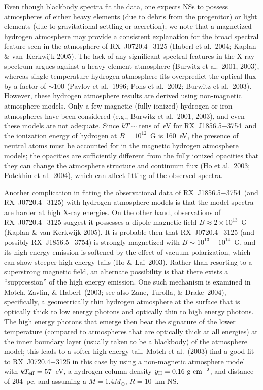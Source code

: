 \documentclass[useAMS,usegraphicx]{mn2e}
\newcommand{\etal}{et al.}
\newcommand{\rxjw}{RX~J1856.5$-$3754}
\newcommand{\ycol}{y_{\rm H}}
\newcommand{\teff}{\ensuremath{T_{\rm eff}}}
\begin{document}
Even though blackbody spectra fit the data, one expects NSs to possess
atmospheres of either heavy elements (due to debris from the progenitor)
or light elements (due to gravitational settling or accretion);
we note that a magnetized hydrogen atmosphere may provide a consistent
explanation for the broad spectral feature seen in the atmosphere of
RX~J0720.4$-$3125 (Haberl \etal~2004; Kaplan \& van~Kerkwijk 2005).
The lack of any significant spectral features in
the X-ray spectrum argues against a heavy element atmosphere (Burwitz
\etal~2001, 2003), whereas single
temperature hydrogen atmosphere fits overpredict the optical flux by a
factor of $\sim 100$ (Pavlov \etal~1996; Pons \etal~2002; Burwitz
\etal~2003).  However, these hydrogen atmosphere results are derived
using non-magnetic atmosphere models.  Only a few magnetic (fully
ionized) hydrogen or iron atmospheres have been considered (e.g.,
Burwitz \etal~2001, 2003), and even these models are not adequate.
Since $kT\sim\mbox{tens of}$~eV for
\rxjw\ and the ionization energy of hydrogen at $B=10^{12}$~G is
160~eV, the presence of neutral atoms must be accounted for in the
magnetic hydrogen atmosphere models; the opacities are sufficiently
different from the fully ionized opacities that they can change the
atmosphere structure and continuum flux (Ho \etal~2003; Potekhin \etal~2004),
which can affect fitting of the observed spectra.

Another complication in fitting the observational data of \rxjw\
(and RX~J0720.4$-$3125) with hydrogen atmosphere models is that the model
spectra are harder at high X-ray energies.
On the other hand, observations of RX~J0720.4$-$3125
suggest it possesses a dipole
magnetic field $B\approx 2\times 10^{13}$~G (Kaplan \& van Kerkwijk 2005).
It is probable then that RX~J0720.4$-$3125 (and possibly \rxjw)
is strongly magnetized with $B\sim 10^{13}-10^{14}$~G,
and its high energy emission is softened by the effect of vacuum
polarization, which can show steeper high energy tails
(Ho \& Lai~2003).
Rather than resorting to a superstrong magnetic field,
an alternate possibility is that there exists a ``suppression'' of the high
energy emission.  One such mechanism is examined in
Motch, Zavlin, \& Haberl~(2003; see also Zane, Turolla, \& Drake~2004),
specifically, a geometrically thin hydrogen atmosphere at the surface
that is optically thick to low energy photons and optically thin to
high energy photons.
The high energy photons that emerge then bear the signature of the
lower temperature (compared to atmospheres that are
optically thick at all energies) at the inner boundary layer
(usually taken to be a blackbody) of the atmosphere model;
this leads to a softer high energy tail.
Motch \etal~(2003) find a good fit to RX~J0720.4$-$3125 in this case
by using a non-magnetic atmosphere model with $k\teff=57$~eV,
a hydrogen column density $\ycol=0.16\mbox{ g cm$^{-2}$}$,
and distance of 204~pc, and assuming a $M=1.4 M_\odot$, $R=10$~km NS.
\end{document}
